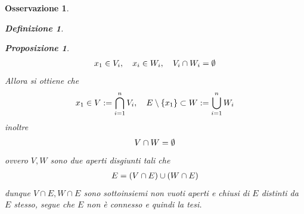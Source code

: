 \documentclass[oneside, 11pt]{amsbook}
\makeatletter
\newcommand{\0}{{(0)}}
\newcommand{\3}{{(3)}}
\theoremstyle{colonplain}
\newtheorem{prop}[thm]{Proposizione}
\theoremstyle{colondefinition}
\newtheorem{defn}[thm]{Definizione}
\theoremstyle{colonremark}
\newtheorem{rmk}[thm]{Osservazione}
\numberwithin{equation}{chapter}
\renewcommand{\proofname}{Dimostrazione}
\renewenvironment{proof}[1][\proofname]{\par
  \pushQED{\end{proof}}%
  \normalfont \topsep6\p@\@plus6\p@\relax
  \trivlist
  \item[\hskip\labelsep\bfseries #1:]\ignorespaces
}{%
  \popQED\endtrivlist\@endpefalse
}
\makeatother
\begin{document}
\begin{rmk}
\begin{defn}
\begin{prop}
\begin{proof}
\begin{align}
    x_1 \in V_i, \quad x_i \in W_i, \quad V_i \cap W_i = \emptyset \notag
\end{align}
Allora si ottiene che
\begin{align}
    x_1 \in V := \bigcap_{i = 1}^n V_i, \quad E \setminus \{ x_1 \} \subset W := \bigcup_{i = 1}^n W_i \notag
\end{align}
inoltre
\begin{align}
    V \cap W = \emptyset \notag
\end{align}
ovvero $V, W$ sono due aperti disgiunti tali che
\begin{align}
    E = (V \cap E) \cup (W \cap E) \notag
\end{align}
dunque $V \cap E, W \cap E$ sono sottoinsiemi non vuoti aperti e chiusi di $E$ distinti da $E$ stesso, segue che $E$ non è connesso e quindi la tesi.
\end{proof}


\end{prop}
\end{defn}
\end{rmk}
\end{document}
